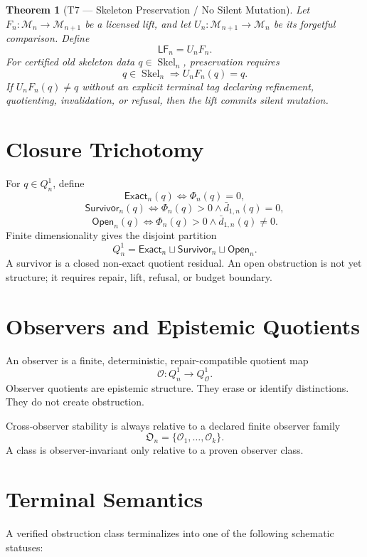 \documentclass[11pt]{article}
\newtheorem{theorem}{Theorem}[section]
\theoremstyle{definition}
\begin{document}
\begin{theorem}[T7 — Skeleton Preservation / No Silent Mutation]
Let \(F_n:\mathcal M_n\to\mathcal M_{n+1}\) be a licensed lift, and let \(U_n:\mathcal M_{n+1}\to\mathcal M_n\) be its forgetful comparison. Define
\[
\mathsf{LF}_n=U_nF_n.
\]
For certified old skeleton data \(q\in\operatorname{Skel}_n\), preservation requires
\[
\boxed{
q\in\operatorname{Skel}_n\Rightarrow U_nF_n(q)=q.
}
\]
If \(U_nF_n(q)\ne q\) without an explicit terminal tag declaring refinement, quotienting, invalidation, or refusal, then the lift commits silent mutation.
\end{theorem}

\section{Closure Trichotomy}

For \(q\in Q^1_n\), define
\[
\mathsf{Exact}_n(q)\iff\Phi_n(q)=0,
\]
\[
\mathsf{Survivor}_n(q)\iff\Phi_n(q)>0\wedge\bar d_{1,n}(q)=0,
\]
\[
\mathsf{Open}_n(q)\iff\Phi_n(q)>0\wedge\bar d_{1,n}(q)\ne0.
\]
Finite dimensionality gives the disjoint partition
\[
Q^1_n=\mathsf{Exact}_n\sqcup\mathsf{Survivor}_n\sqcup\mathsf{Open}_n.
\]
A survivor is a closed non-exact quotient residual. An open obstruction is not yet structure; it requires repair, lift, refusal, or budget boundary.

\section{Observers and Epistemic Quotients}

An observer is a finite, deterministic, repair-compatible quotient map
\[
\mathcal O:Q^1_n\to Q^1_{\mathcal O}.
\]
Observer quotients are epistemic structure. They erase or identify distinctions. They do not create obstruction.

Cross-observer stability is always relative to a declared finite observer family
\[
\mathfrak O_n=\{\mathcal O_1,\dots,\mathcal O_k\}.
\]
A class is observer-invariant only relative to a proven observer class.

\section{Terminal Semantics}

A verified obstruction class terminalizes into one of the following schematic statuses:
\end{document}
